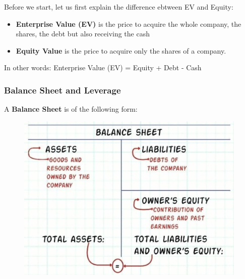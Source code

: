 \documentclass[a4paper]{extarticle}
\begin{document}
Before we start, let us first explain the difference ebtween EV and Equity:

\begin{itemize}
    \item \textbf{Enterprise Value (EV)} is the price to acquire the whole company, the shares, the debt but also receiving the cash
    \item \textbf{Equity Value} is the price to acquire only the shares of a company.
\end{itemize}

In other words: Enterprise Value (EV) = Equity + Debt - Cash

\subsubsection{Balance Sheet and Leverage}

A \textbf{Balance Sheet} is of the following form:

\begin{figure}[H]
    \includegraphics[width=11cm]{../images/EnpRisk_Fig3-1}
    \centering
\end{figure}
\end{document}
